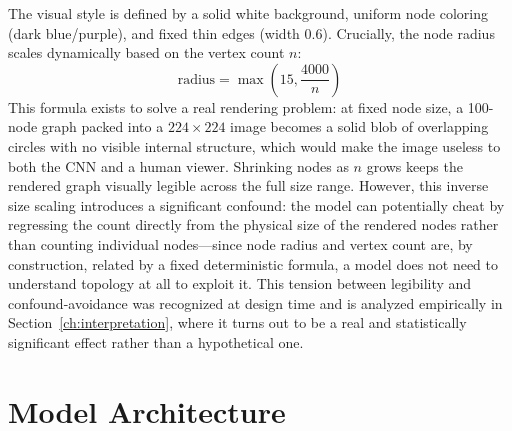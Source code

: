 \documentclass[11pt,letterpaper]{article}
\numberwithin{equation}{section}
\numberwithin{figure}{section}
\numberwithin{table}{section}
\begin{document}
The visual style is defined by a solid white background, uniform node coloring (dark blue/purple), and fixed thin edges (width 0.6). Crucially, the node radius scales dynamically based on the vertex count $n$:
\begin{equation}
\text{radius} = \max\left(15, \frac{4000}{n}\right)
\label{eq:node_radius}
\end{equation}
This formula exists to solve a real rendering problem: at fixed node size, a 100-node graph packed into a $224\times224$ image becomes a solid blob of overlapping circles with no visible internal structure, which would make the image useless to both the CNN and a human viewer. Shrinking nodes as $n$ grows keeps the rendered graph visually legible across the full size range. However, this inverse size scaling introduces a significant confound: the model can potentially cheat by regressing the count directly from the physical size of the rendered nodes rather than counting individual nodes---since node radius and vertex count are, by construction, related by a fixed deterministic formula, a model does not need to understand topology at all to exploit it. This tension between legibility and confound-avoidance was recognized at design time and is analyzed empirically in Section~\ref{ch:interpretation}, where it turns out to be a real and statistically significant effect rather than a hypothetical one.

\section{Model Architecture}
\label{sec:model}
\end{document}
